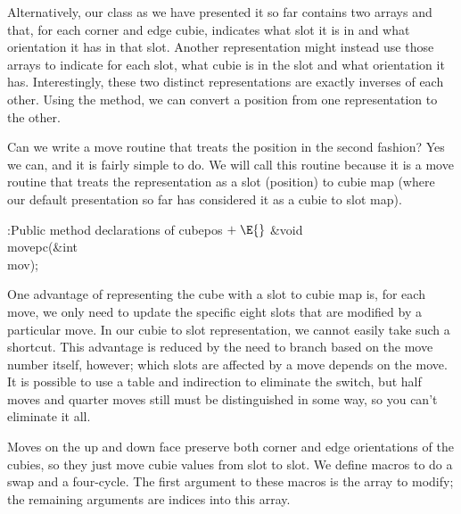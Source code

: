 Alternatively, our class as we have presented it so far contains two
arrays  and  that, for each corner and edge cubie, indicates
what slot it is in and what orientation it has in that slot.  Another
representation might instead use those arrays to indicate for each
slot, what cubie is in the slot and what orientation it has.
Interestingly, these two distinct representations are exactly
inverses of each other.  Using the  method, we can
convert a position from one representation to the other.

Can we write a move routine that treats the position in the second
fashion?  Yes we can, and it is fairly simple to do.  We will call
this routine  because it is a move routine that treats the
representation as a slot (position) to cubie map (where our default
presentation so far has considered it as a cubie to slot map).

\Y\B\4:Public method declarations of cubepos\X${}\mathrel+\E{}$\6
\&{void} \\{movepc}(\&{int} \\{mov});\par
\fi

One advantage of representing the cube with a slot to cubie map is,
for each move, we only need to update the specific eight slots that
are modified by a particular move.  In our cubie to slot
representation, we cannot easily take such a shortcut.  This advantage
is reduced by the need to branch based on the move number itself,
however; which slots are affected by a move depends on the move.  It
is possible to use a table and indirection to eliminate the switch,
but half moves and quarter moves still must be distinguished in some
way, so you can't eliminate it all.

Moves on the up and down face preserve both corner and edge
orientations of the cubies, so they just move cubie values from
slot to slot.  We define macros to do a swap and a four-cycle.
The first argument to these macros is the array to modify; the
remaining arguments are indices into this array.

